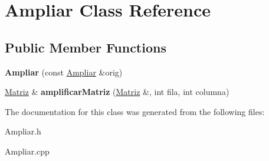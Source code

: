 \hypertarget{class_ampliar}{}\section{Ampliar Class Reference}
\label{class_ampliar}
\subsection*{Public Member Functions}
\begin{DoxyCompactItemize}
\item 
\mbox{\label{class_ampliar_abea2aa1f613fff981e89e54ed01ec71b}} 
{\bfseries Ampliar} (const \hyperlink{class_ampliar}{Ampliar} \&orig)
\item 
\mbox{\label{class_ampliar_a9de03d0e80cc4ff58f13285744f41ed9}} 
\hyperlink{class_matriz}{Matriz} \& {\bfseries amplificar\+Matriz} (\hyperlink{class_matriz}{Matriz} \&, int fila, int columna)
\end{DoxyCompactItemize}


The documentation for this class was generated from the following files\+:\begin{DoxyCompactItemize}
\item 
Ampliar.\+h\item 
Ampliar.\+cpp\end{DoxyCompactItemize}
